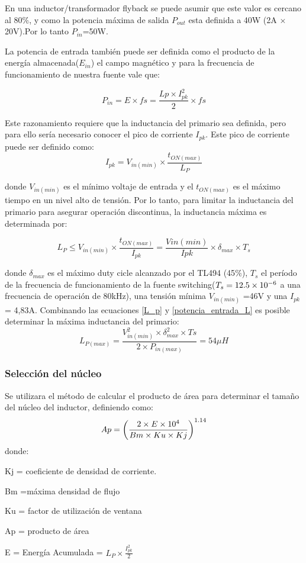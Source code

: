 En una inductor/transformador flyback se puede asumir que este valor es cercano al $80\%$, y como la potencia máxima de salida $P_{out}$ esta definida a 40W (2A $\times$ 20V).Por lo tanto $P_{in}$=50W.

La potencia de entrada también puede ser definida como el producto de la energía almacenada($E_{in}$) el campo magnético y para la frecuencia de funcionamiento de nuestra fuente vale que:

\begin{equation}
P_{in}= E \times fs = \frac{Lp \times I_{pk}^2}{2} \times fs \label{potencia_entrada_L}
\end{equation}

Este razonamiento requiere que la inductancia del primario sea definida, pero para ello sería necesario conocer el pico de corriente $I_{pk}$. Este pico de corriente puede ser definido como:
$$
I_{pk}=V_{in(min)} \times \frac{t_{ON(max)}}{L_P}
$$

donde $V_{in(min)}$ es el mínimo voltaje de entrada y el $t_{ON(max)}$ es el máximo tiempo en un nivel alto de tensión. Por lo tanto, para limitar la inductancia del primario para asegurar operación discontinua, la inductancia máxima es determinada por:

\begin{equation}
L_P \leq V_{in(min)} \times \frac{t_{ON(max)}}{I_{pk}}= \frac{V{in(min)}}{Ipk} \times \delta_{max} \times T_s \label{L_p}   
\end{equation}

donde  $\delta_{max}$ es el máximo duty cicle alcanzado por el TL494 (45$\%$), $T_s$ el período de la frecuencia de funcionamiento de la fuente switching($T_s =12.5\times 10^{-6}$ a una frecuencia de operación de 80kHz), una tensión mínima $V_{in(min)}$ =46V y una $I_{pk}$= 4,83A.
Combinando las ecuaciones \ref{L_p} y \ref{potencia_entrada_L} es posible determinar la máxima inductancia del primario:
$$
L_{P(max)} = \frac{V_{in(min)}^2 \times \delta_{max}^2 \times Ts}{2 \times P_{in(max)}} = 54\mu H
$$

\medskip
\subsubsection{Selección del núcleo}
\medskip

Se utilizara el método de calcular el producto de área para determinar el tamaño del núcleo del inductor, definiendo como:
$$
Ap= {\left( \frac{  2 \times E \times 10^{4}}{Bm \times Ku \times Kj} \right) } ^{ 1.14}
$$
donde:
\begin{list}{ }
\item Kj = coeficiente de densidad de corriente.
\item Bm =máxima densidad  de flujo 
\item Ku = factor de utilización de ventana 
\item Ap = producto de área 
\item E = Energía Acumulada = $ L_P \times \frac{I_{pk}^2 }{2}$ 
\item
\end{list}


